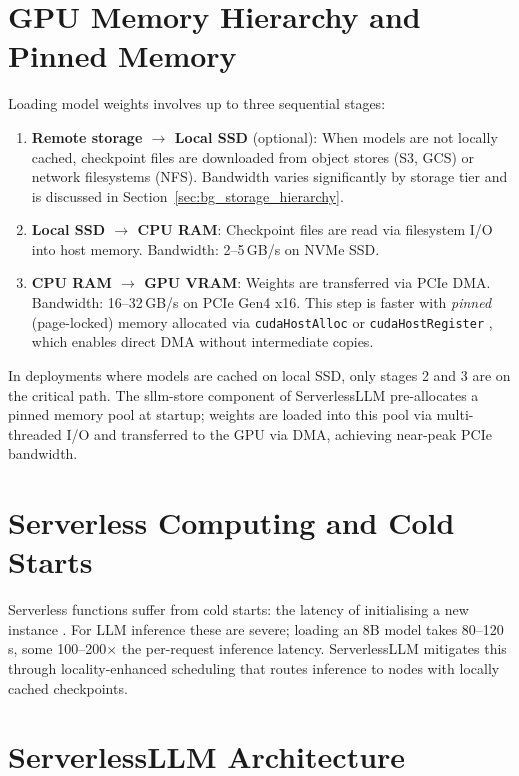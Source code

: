 \documentclass[logo,bsc,singlespacing,parskip,online]{infthesis}
\begin{document}
\section{GPU Memory Hierarchy and Pinned Memory}
\label{sec:bg_pinned_memory}

Loading model weights involves up to three sequential stages:

\begin{enumerate}
  \item \textbf{Remote storage $\to$ Local SSD} (optional): When models are not locally cached, checkpoint files are downloaded from object stores (S3, GCS) or network filesystems (NFS). Bandwidth varies significantly by storage tier and is discussed in Section~\ref{sec:bg_storage_hierarchy}.
  \item \textbf{Local SSD $\to$ CPU RAM}: Checkpoint files are read via filesystem I/O into host memory. Bandwidth: 2--5\,GB/s on NVMe SSD.
  \item \textbf{CPU RAM $\to$ GPU VRAM}: Weights are transferred via PCIe DMA. Bandwidth: 16--32\,GB/s on PCIe Gen4 x16. This step is faster with \emph{pinned} (page-locked) memory allocated via \texttt{cudaHostAlloc} or \texttt{cudaHostRegister} \citep{cuda_guide2024}, which enables direct DMA without intermediate copies.
\end{enumerate}

In deployments where models are cached on local SSD, only stages 2 and 3 are on the critical path. The sllm-store component of ServerlessLLM \citep{fu2024serverlessllm} pre-allocates a pinned memory pool at startup; weights are loaded into this pool via multi-threaded I/O and transferred to the GPU via DMA, achieving near-peak PCIe bandwidth.

\section{Serverless Computing and Cold Starts}

Serverless functions suffer from cold starts: the latency of initialising a new instance \citep{shahrad2020serverless}. For LLM inference these are severe; loading an 8B model takes 80--120\,s, some 100--200$\times$ the per-request inference latency. ServerlessLLM \citep{fu2024serverlessllm} mitigates this through locality-enhanced scheduling that routes inference to nodes with locally cached checkpoints.

\section{ServerlessLLM Architecture}
\label{sec:bg_serverlessllm}
\end{document}
